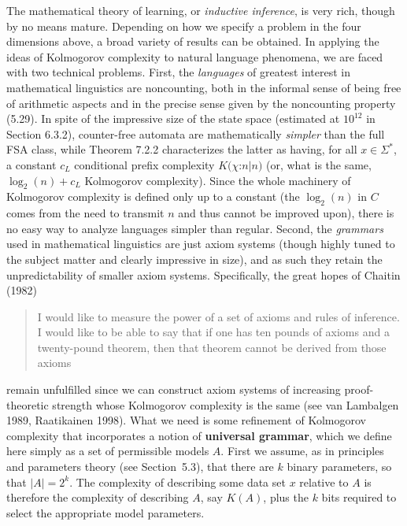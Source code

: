 The mathematical theory of learning, or {\it inductive inference}, is very
rich, though by no means mature. Depending on how we specify a problem in the
four dimensions above, a broad variety of results can be obtained.  In
applying the ideas of Kolmogorov complexity to natural language phenomena, we
are faced with two technical problems. First, the {\it languages} of greatest
interest in mathematical linguistics are noncounting, both in the informal
sense of being free of arithmetic aspects and in the precise sense given by
the noncounting property (5.29). In spite of the impressive size of the state
space (estimated at $10^{12}$ in Section 6.3.2), counter-free automata are
mathematically {\it simpler} than the full FSA class, while Theorem 7.2.2
characterizes the latter as having, for all $x \in \Sigma^*$, a constant $c_L$
conditional prefix complexity $K(\chi$:$n|n)$ (or, what is the same,
$\log_2(n) +c_L$ Kolmogorov complexity). Since the whole machinery of
Kolmogorov complexity is defined only up to a constant (the $\log_2 (n)$ in
$C$ comes from the need to transmit $n$ and thus cannot be improved upon),
there is no easy way to analyze languages simpler than regular.  Second, the
{\it grammars} used in mathematical linguistics are just axiom systems (though
highly tuned to the subject matter and clearly impressive in size), and as
such they retain the unpredictability of smaller axiom systems. Specifically,
the great hopes of Chaitin (1982)

\begin{quote}
I would like to measure the power of a set of axioms and rules of inference. I
would like to be able to say that if one has ten pounds of axioms and a
twenty-pound theorem, then that theorem cannot be derived from those axioms
\end{quote}

\smallskip\noindent remain unfulfilled since we can construct axiom systems of
increasing proof-theoretic strength whose Kolmogorov complexity is the same
(see van Lambalgen 1989, Raatikainen
1998).\nocite{Lambalgen:1989}\nocite{Raatikainen:1998} What we need is some
refinement of Kolmogorov complexity that incorporates a notion of {\bf
  universal grammar}, which we define here
simply as a set of permissible models $A$. First we assume, as in principles
and parameters theory (see Section~5.3), that there are $k$ binary parameters,
so that $|A|=2^k$. The complexity of describing some data set $x$ relative to
$A$ is therefore the complexity of describing $A$, say $K(A)$, plus the $k$
bits required to select the appropriate model parameters.

